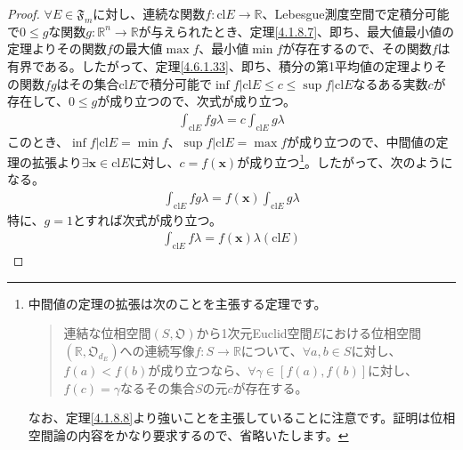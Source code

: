 \documentclass[dvipdfmx]{jsarticle}
\begin{document}
\begin{proof}
$\forall E \in \mathfrak{F}_{m}$に対し、連続な関数$f:\mathrm{cl}E \rightarrow \mathbb{R}$、Lebesgue測度空間で定積分可能で$0 \leq g$な関数$g:\mathbb{R}^{n} \rightarrow \mathbb{R}$が与えられたとき、定理\ref{4.1.8.7}、即ち、最大値最小値の定理よりその関数$f$の最大値$\max f$、最小値$\min f$が存在するので、その関数$f$は有界である。したがって、定理\ref{4.6.1.33}、即ち、積分の第1平均値の定理よりその関数$fg$はその集合$\mathrm{cl}E$で積分可能で$\inf{f|\mathrm{cl}E} \leq c \leq \sup{f|\mathrm{cl}E}$なるある実数$c$が存在して、$0 \leq g$が成り立つので、次式が成り立つ。
\begin{align*}
\int_{\mathrm{cl}E} {fg\lambda} = c\int_{\mathrm{cl}E} {g\lambda}
\end{align*}
このとき、$\inf{f|\mathrm{cl}E} = \min f$、$\sup{f|\mathrm{cl}E} = \max f$が成り立つので、中間値の定理の拡張より$\exists\mathbf{x} \in \mathrm{cl}E$に対し、$c = f\left( \mathbf{x} \right)$が成り立つ\footnote{中間値の定理の拡張は次のことを主張する定理です。
\begin{quote}
連結な位相空間$\left( S,\mathfrak{O} \right)$から1次元Euclid空間$E$における位相空間$\left( \mathbb{R},\mathfrak{O}_{d_{E}} \right)$への連続写像$f:S \rightarrow \mathbb{R}$について、$\forall a,b \in S$に対し、$f(a) < f(b)$が成り立つなら、$\forall\gamma \in \left[ f(a),f(b) \right]$に対し、$f(c) = \gamma$なるその集合$S$の元$c$が存在する。
\end{quote}
なお、定理\ref{4.1.8.8}より強いことを主張していることに注意です。証明は位相空間論の内容をかなり要求するので、省略いたします。}。したがって、次のようになる。
\begin{align*}
\int_{\mathrm{cl}E} {fg\lambda} = f\left( \mathbf{x} \right)\int_{\mathrm{cl}E} {g\lambda}
\end{align*}
特に、$g = 1$とすれば次式が成り立つ。
\begin{align*}
\int_{\mathrm{cl}E} {f\lambda} = f\left( \mathbf{x} \right)\lambda\left( \mathrm{cl}E \right)
\end{align*}
\end{proof}
\end{document}
